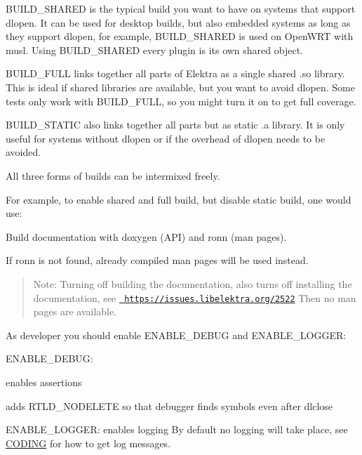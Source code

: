 {\ttfamily B\+U\+I\+L\+D\+\_\+\+S\+H\+A\+R\+ED} is the typical build you want to have on systems that support {\ttfamily dlopen}. It can be used for desktop builds, but also embedded systems as long as they support {\ttfamily dlopen}, for example, {\ttfamily B\+U\+I\+L\+D\+\_\+\+S\+H\+A\+R\+ED} is used on Open\+W\+RT with {\ttfamily musl}. Using {\ttfamily B\+U\+I\+L\+D\+\_\+\+S\+H\+A\+R\+ED} every plugin is its own shared object.

{\ttfamily B\+U\+I\+L\+D\+\_\+\+F\+U\+LL} links together all parts of Elektra as a single shared {\ttfamily .so} library. This is ideal if shared libraries are available, but you want to avoid {\ttfamily dlopen}. Some tests only work with {\ttfamily B\+U\+I\+L\+D\+\_\+\+F\+U\+LL}, so you might turn it on to get full coverage.

{\ttfamily B\+U\+I\+L\+D\+\_\+\+S\+T\+A\+T\+IC} also links together all parts but as static {\ttfamily .a} library. It is only useful for systems without {\ttfamily dlopen} or if the overhead of {\ttfamily dlopen} needs to be avoided.

All three forms of builds can be intermixed freely.

For example, to enable shared and full build, but disable static build, one would use\+:


\begin{DoxyCode}{0}
\end{DoxyCode}


Build documentation with doxygen (A\+PI) and ronn (man pages).

If ronn is not found, already compiled man pages will be used instead.

\begin{quote}
Note\+: Turning off building the documentation, also turns off installing the documentation, see \href{https://issues.libelektra.org/2522}{\texttt{ https\+://issues.\+libelektra.\+org/2522}} Then no man pages are available. \end{quote}


As developer you should enable {\ttfamily E\+N\+A\+B\+L\+E\+\_\+\+D\+E\+B\+UG} and {\ttfamily E\+N\+A\+B\+L\+E\+\_\+\+L\+O\+G\+G\+ER}\+:


\begin{DoxyItemize}
\item {\ttfamily E\+N\+A\+B\+L\+E\+\_\+\+D\+E\+B\+UG}\+:
\begin{DoxyItemize}
\item enables assertions
\item adds R\+T\+L\+D\+\_\+\+N\+O\+D\+E\+L\+E\+TE so that debugger finds symbols even after dlclose
\end{DoxyItemize}
\item {\ttfamily E\+N\+A\+B\+L\+E\+\_\+\+L\+O\+G\+G\+ER}\+: enables logging By default no logging will take place, see \mbox{\hyperlink{doc_CODING_md}{C\+O\+D\+I\+NG}} for how to get log messages.
\end{DoxyItemize}

